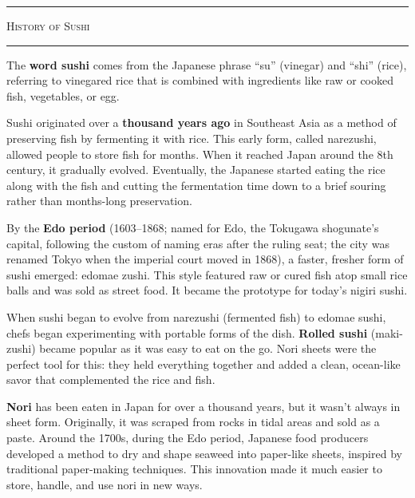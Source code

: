 \documentclass[landscape, a4paper]{article}
\newcommand\alert[1]{\textcolor{PrimaryColor}{\textbf{#1}}}
\begin{document}
\begin{minipage}[t]{0.31\textwidth}
	\vspace{0.5cm}
	\setlength{\parskip}{0.25cm}

	\textcolor{WasabiText}{
		\rule{\linewidth}{0.5mm}
		\vspace{-0.1cm}
		\begin{center}
			\large
			\textsc{History of Sushi}
		\end{center}
		\rule{\linewidth}{0.5mm}
	}

	The \alert{word sushi} comes from the Japanese phrase \enquote{su} (vinegar) and \enquote{shi} (rice), referring to vinegared rice that is combined with ingredients like raw or cooked fish, vegetables, or egg.

	Sushi originated over a \alert{thousand years ago} in Southeast Asia as a method of preserving fish by fermenting it with rice. This early form, called narezushi, allowed people to store fish for months. When it reached Japan around the 8th century, it gradually evolved. Eventually, the Japanese started eating the rice along with the fish and cutting the fermentation time down to a brief souring rather than months-long preservation.

	By the \alert{Edo period} (1603–1868; named for Edo, the Tokugawa shogunate’s capital, following the custom of naming eras after the ruling seat; the city was renamed Tokyo when the imperial court moved in 1868), a faster, fresher form of sushi emerged: edomae zushi. This style featured raw or cured fish atop small rice balls and was sold as street food. It became the prototype for today’s nigiri sushi.

	When sushi began to evolve from narezushi (fermented fish) to edomae sushi, chefs began experimenting with portable forms of the dish. \alert{Rolled sushi} (maki-zushi) became popular as it was easy to eat on the go. Nori sheets were the perfect tool for this: they held everything together and added a clean, ocean-like savor that complemented the rice and fish.

	\alert{Nori} has been eaten in Japan for over a thousand years, but it wasn't always in sheet form. Originally, it was scraped from rocks in tidal areas and sold as a paste. Around the 1700s, during the Edo period, Japanese food producers developed a method to dry and shape seaweed into paper-like sheets, inspired by traditional paper-making techniques. This innovation made it much easier to store, handle, and use nori in new ways.


\end{minipage}
\end{document}
